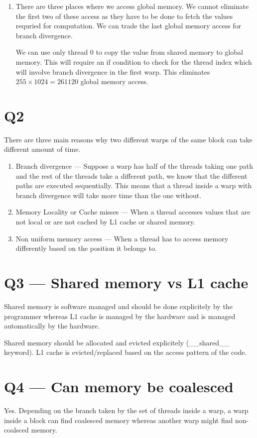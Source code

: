 \documentclass{article}
\begin{document}
\begin{enumerate}
  \item There are three places where we access global memory.  
    We cannot eliminate the first two of these access as they have to be done to fetch the values requried for computation.
    We can trade the last global memory access for branch divergence.

    We can use only thread 0 to copy the value from shared memory to global memory.  This will require an if condition to check for the thread index which will involve branch divergence in the first warp.  This eliminates $255 \times 1024 = 261120$ global memory access.

\end{enumerate}

\section*{Q2}
There are three main reasons why two different warps of the same block can take different amount of time.
\begin{enumerate}
  \item Branch divergence --- Suppose a warp has half of the threads taking one path and the rest of the threads take a different path, we know that the different paths are executed sequentially.  
    This means that a thread inside a warp with branch divergence will take more time than the one without.
  \item Memory Locality or Cache misses --- When a thread accesses values that are not local or are not cached by L1 cache or shared memory.

  \item Non uniform memory access --- When a thread has to access memory differently based on the position it belongs to.
\end{enumerate}


\section*{Q3 --- Shared memory vs L1 cache}
Shared memory is software managed and should be done explicitely by the programmer whereas L1 cache is managed by the hardware and is managed automatically by the hardware.

Shared memory should be allocated and evicted explicitely (\_\_shared\_\_ keyword).  L1 cache is evicted/replaced based on the access pattern of the code.

\section*{Q4 --- Can memory be coalesced}
Yes.  Depending on the branch taken by the set of threads inside a warp, a warp inside a block can find coalesced memory whereas another warp might find non-coalsced memory.
\end{document}
